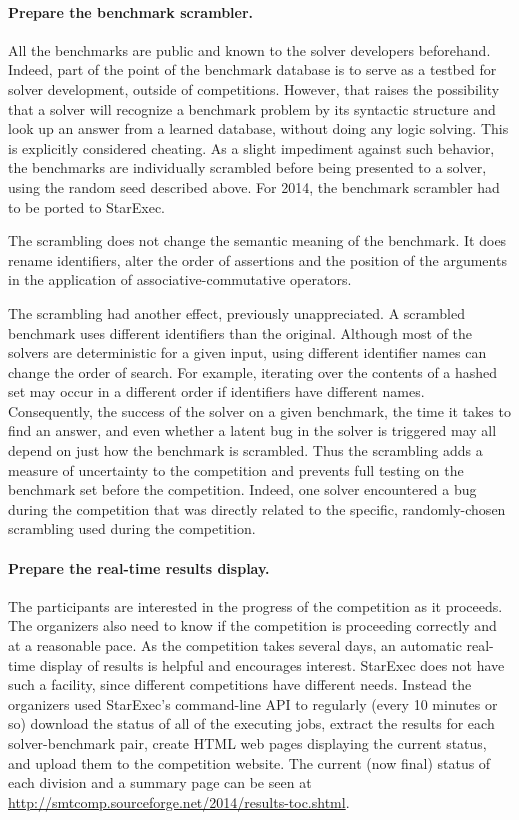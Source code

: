 \documentclass[twoside,11pt]{article}
\begin{document}
\paragraph{Prepare the benchmark scrambler.} All the benchmarks are public and known to the solver developers beforehand. Indeed, part of the point of the benchmark database is to serve as a testbed for solver development, outside of competitions. However, that raises the possibility that a solver will recognize a benchmark problem by its syntactic structure and look up an answer from a learned database, without doing any logic solving. This is explicitly considered cheating. As a slight impediment against such behavior, the benchmarks are individually scrambled before being presented to a solver, using the random seed described above. For 2014, the benchmark scrambler had to be ported to StarExec.

The scrambling does not change the semantic meaning of the benchmark. It does rename identifiers, alter the order of assertions and the position of the arguments in the application of associative-commutative operators.

The scrambling had another effect, previously unappreciated. A scrambled benchmark uses different identifiers than the original. Although most of the solvers are deterministic for a given input, using different identifier names can change the order of search. For example, iterating over the contents of a hashed set may occur in a different order if identifiers have different names. Consequently, the success of the solver on a given benchmark, the time it takes to find an answer, and even whether a latent bug in the solver is triggered may all depend on just how the benchmark is scrambled. Thus the scrambling adds a measure of uncertainty to the competition and prevents full testing on the benchmark set before the competition. Indeed, one solver encountered a bug during the competition that was directly related to the specific, randomly-chosen scrambling used during the competition.

\paragraph{Prepare the real-time results display.} The participants are interested in the progress of the competition as it proceeds. The organizers also need to know if the competition is proceeding correctly and at a reasonable pace. As the competition takes several days, an automatic real-time display of results is helpful and encourages interest.  StarExec does not have such a facility, since different competitions have different needs. Instead the organizers used StarExec's command-line API to regularly (every 10 minutes or so) download the status of all of the executing jobs, extract the results for each solver-benchmark pair, create HTML web pages displaying the current status, and upload them to the competition website. The current (now final) status of each division and a summary page can be seen at \url{http://smtcomp.sourceforge.net/2014/results-toc.shtml}.
\end{document}
